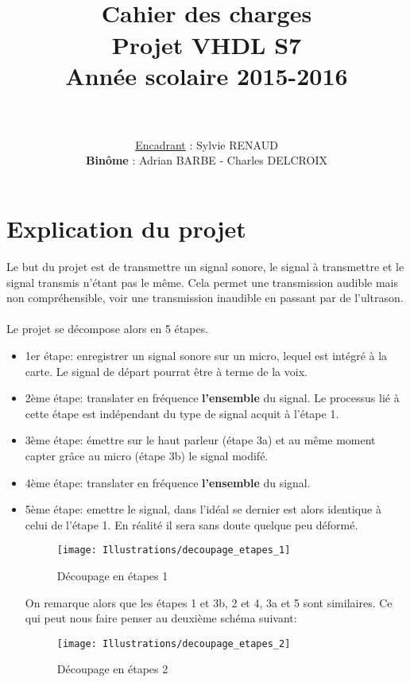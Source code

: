 \documentclass[paper=a4, fontsize=12pt]{article}
\title{
  \usefont{OT1}{bch}{b}{n}
  \horrule{1.5pt} \\[0.5cm]	
  \Huge \textbf{Cahier des charges} \\ [10pt]
  \Huge Projet VHDL S7\\ [15pt]
  \LARGE Année scolaire 2015-2016 \\ 
  \horrule{1.5pt} \\[0.5cm]
}
\author{
  \huge \underline{Encadrant} : \LARGE Sylvie RENAUD\\[20pt]
  \normalfont 							
  \huge \textbf{Binôme} : \Large Adrian BARBE - Charles DELCROIX \\[5pt]
		\normalsize
}
\date{}
\numberwithin{equation}{section}		%
\numberwithin{figure}{section}			%
\numberwithin{table}{section}				%
\begin{document}
\maketitle
\newpage

\tableofcontents

\newpage

\section{Explication du projet}

Le but du projet est de transmettre un signal sonore, le signal à transmettre et le signal transmis n'étant pas le même.
Cela permet une transmission audible mais non compréhensible, voir une transmission inaudible en passant par de l'ultrason.
\\\\Le projet se décompose alors en 5 étapes.
\begin{itemize}[label=$\square$,leftmargin=* ,parsep=0cm,itemsep=0cm,topsep=0cm]
\item 1er étape: enregistrer un signal sonore sur un micro, lequel est intégré à la carte. Le signal de départ pourrat être à terme de la voix.
\item 2ème étape: translater en fréquence \textbf{l'ensemble} du signal. Le processus lié à cette étape est indépendant du type de signal acquit à l'étape 1.
\item 3ème étape: émettre sur le haut parleur (étape 3a) et au même moment capter grâce au micro (étape 3b) le signal modifé.
\item 4ème étape: translater en fréquence \textbf{l'ensemble} du signal.
\item 5ème étape: emettre le signal, dans l'idéal se dernier est alors identique à celui de l'étape 1. En réalité il sera sans doute quelque peu déformé.

\begin{figure}[h!]
\centerline{\texttt{[image: Illustrations/decoupage\_etapes\_1]}}
\caption{\label{Illustrations/decoupage_etapes_1} Découpage en étapes 1}
\end{figure}

On remarque alors que les étapes 1 et 3b, 2 et 4, 3a et 5 sont similaires. Ce qui peut nous faire penser au deuxième schéma suivant:

\begin{figure}[h!]
\centerline{\texttt{[image: Illustrations/decoupage\_etapes\_2]}}
\caption{\label{Illustrations/decoupage_etapes_2} Découpage en étapes 2}
\end{figure}


\end{itemize}
\end{document}

